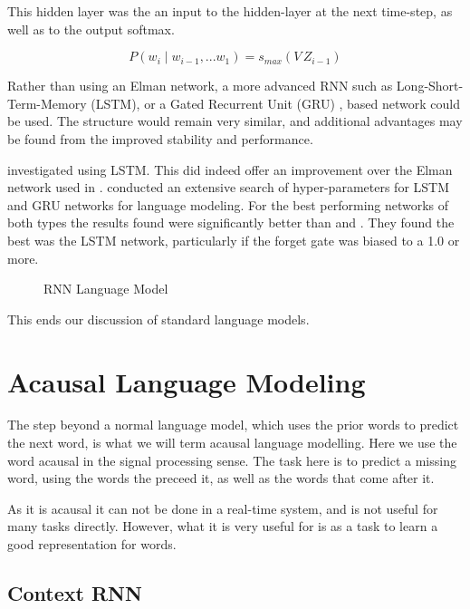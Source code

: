 \documentclass[parskip]{komatufte}
\begin{document}
This hidden layer was the an input to the hidden-layer at the next time-step, as well as to the output softmax.

\begin{equation}
	P(w_i \mid w_{i-1}, ... w_{1}) = s_{max}\left(V \, Z_{i-1} \right)
\end{equation}



Rather than using an Elman network, a more advanced RNN such as Long-Short-Term-Memory (LSTM), or a Gated Recurrent Unit (GRU) , based network could be used.
The structure would remain very similar,
and additional advantages may be found from the improved stability and performance.

 investigated using LSTM.
This did indeed offer an improvement over the Elman network used in \textcite{mikolov2010recurrent}.
 conducted an extensive search of hyper-parameters for LSTM and GRU networks for language modeling.
For the best performing networks of both types the results found were significantly better than \textcite{sundermeyer2012lstm} and \textcite{mikolov2010recurrent}.
They found the best was the LSTM network, particularly if the forget gate was biased to a 1.0 or more.

\begin{figure}
	\centering
	 
	\caption{\label{fig:neural-language-model} RNN Language Model}
\end{figure}

This ends our discussion of standard language models.


\section{Acausal Language Modeling}
The step beyond a normal language model,
which uses the prior words to predict the next word,
is what we will term acausal language modelling.
Here we use the word acausal in the signal processing sense.
The task here is to predict a missing word, using the words the preceed it, as well as the words that come after it.

As it is acausal it can not be done in a real-time system, and is not useful for many tasks directly.
However, what it is very useful for is as a task to learn a good representation for words.


\subsection{Context RNN}
\end{document}

